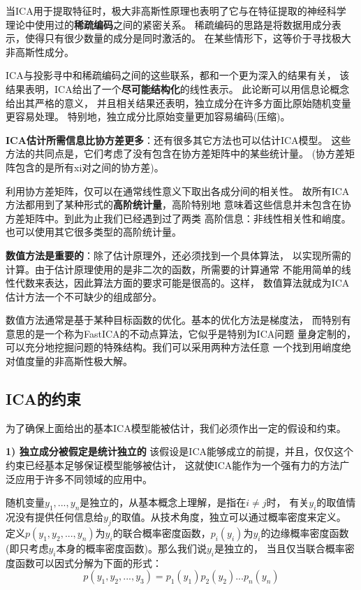 当ICA用于提取特征时，极大非高斯性原理也表明了它与在特征提取的神经科学
理论中使用过的\textbf{稀疏编码}之间的紧密关系。
稀疏编码的思路是将数据用成分表示，使得只有很少数量的成分是同时激活的。
在某些情形下，这等价于寻找极大非高斯性成分。

ICA与投影寻中和稀疏编码之间的这些联系，都和一个更为深入的结果有关，
该结果表明，ICA给出了一个\textbf{尽可能结构化}的线性表示。
此论断可以用信息论概念给出其严格的意义，
并且相关结果还表明，独立成分在许多方面比原始随机变量更容易处理。
特别地，独立成分比原始变量更加容易编码(压缩)。
    
\textbf{ICA估计所需信息比协方差更多}：还有很多其它方法也可以估计ICA模型。
这些方法的共同点是，它们考虑了没有包含在协方差矩阵中的某些统计量。
(协方差矩阵包含的是所有xi对之间的协方差)。

利用协方差矩阵，仅可以在通常线性意义下取出各成分间的相关性。
故所有ICA方法都用到了某种形式的\textbf{高阶统计量}，高阶特别地
意味着这些信息并未包含在协方差矩阵中。到此为止我们已经遇到过了两类
高阶信息：非线性相关性和峭度。也可以使用其它很多类型的高阶统计量。
    
\textbf{数值方法是重要的}：除了估计原理外，还必须找到一个具体算法，
以实现所需的计算。由于估计原理使用的是非二次的函数，所需要的计算通常
不能用简单的线性代数来表达，因此算法方面的要求可能是很高的。这样，
数值算法就成为ICA估计方法一个不可缺少的组成部分。

数值方法通常是基于某种目标函数的优化。基本的优化方法是梯度法，
而特别有意思的是一个称为FastICA的不动点算法，它似乎是特别为ICA问题
量身定制的，可以充分地挖掘问题的特殊结构。我们可以采用两种方法任意
一个找到用峭度绝对值度量的非高斯性极大解。

\subsection{ICA的约束}
为了确保上面给出的基本ICA模型能被估计，我们必须作出一定的假设和约束。

\textbf{1) 独立成分被假定是统计独立的}
该假设是ICA能够成立的前提，并且，仅仅这个约束已经基本足够保证模型能够被估计，
这就使ICA能作为一个强有力的方法广泛应用于许多不同领域的应用中。

随机变量$y_1,...,y_n$是独立的，从基本概念上理解，是指在$i \ne j$时，
有关$y_i$的取值情况没有提供任何信息给$y_j$的取值。从技术角度，独立可以通过概率密度来定义。
定义$p(y_1,y_2,...,y_n)$为$y_i$的联合概率密度函数，$p_i(y_i)$为$y_i$的边缘概率密度函数
(即只考虑$y_i$本身的概率密度函数)。那么我们说$y_i$是独立的，
当且仅当联合概率密度函数可以因式分解为下面的形式：
\begin{equation}
p(y_1, y_2, ..., y_3) = p_1(y_1)p_2(y_2)...p_n (y_n)
\end{equation}

